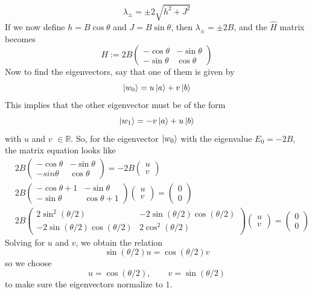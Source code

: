 \documentclass[../thesis_main.tex]{subfiles}
\begin{document}
\[
    \lambda_\pm = \pm 2 \sqrt{h^2 + J^2}
\]
If we now define $\boxed{h = B \cos \theta}$ and $\boxed{J = B \sin \theta}$, then $\lambda_\pm = \pm 2B$, and the $\hat{H}$ matrix becomes
\[
    H := 2B \left(\begin{array}{cc}
    -\cos \theta  & -\sin \theta  \\ 
    -\sin \theta  & \cos \theta 
    \end{array}\right)
\]   
Now to find the eigenvectors, say that one of them is given by 
\[
    \ket{w_0} = u \ket{a} + v \ket{b}
\] 
This implies that the other eigenvector must be of the form
\[
    \ket{w_1} = -v \ket{a} + u \ket{b}
\]
with $u$ and $v$ $\in \mathbb{R}$. So, for the eigenvector $\ket{w_0}$  with the eigenvalue $E_0 = -2B$, the matrix equation looks like
\begin{align*}
    & 2B \left(\begin{array}{cc}
    -\cos \theta  & -\sin \theta  \\ 
    -sin \theta  & \cos \theta 
    \end{array}\right) = -2B 
    \left(\begin{array}{c}
    u \\ 
    v
    \end{array}\right) \\
    & 2B \left(\begin{array}{cc}
    -\cos \theta +1 & -\sin \theta  \\ 
    - \sin \theta  & \cos \theta + 1
    \end{array}\right)
    \left(\begin{array}{c}
    u \\ 
    v
    \end{array}\right) = 
    \left(\begin{array}{c}
    0 \\ 
    0
    \end{array}\right) \\
    & 2B \left(\begin{array}{cc}
    2 \sin^2(\theta/2) & -2\sin(\theta /2) \cos(\theta /2) \\ 
    -2 \sin(\theta /2) \cos(\theta /2) & 2 \cos^2(\theta /2)
    \end{array}\right) 
    \left(\begin{array}{c}
    u \\ 
    v
    \end{array}\right) = 
    \left(\begin{array}{c}
    0 \\ 
    0
    \end{array}\right)
\end{align*}
Solving for $u$ and $v$, we obtain the relation 
\[
    \sin (\theta /2) u = \cos (\theta /2) v
\]   
so we choose 
\[
    \boxed{u = \cos(\theta /2), \qquad v = \sin (\theta /2)}
\]
to make sure the eigenvectors normalize to $1$.
\end{document}
